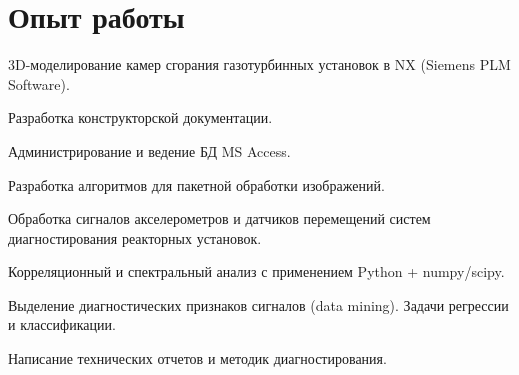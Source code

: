 \documentclass[a4paper]{resume}
\begin{document}
\begin{minipage}[t]{0.64\textwidth} %

\section{Опыт работы}


\vspace{\topsep} %
\begin{tightitemize}
\item 3D-моделирование камер сгорания газотурбинных установок в NX (Siemens PLM Software).
\item Разработка конструкторской документации.
\end{tightitemize}

\sectionspace 


\begin{tightitemize}
\item Администрирование и ведение БД MS Access.
\item Разработка алгоритмов для пакетной обработки изображений. 
\end{tightitemize}

\sectionspace 


\begin{tightitemize}
\item Обработка сигналов акселерометров и датчиков перемещений систем диагностирования реакторных установок. \item Корреляционный и спектральный анализ с применением Python + numpy/scipy.
\item Выделение диагностических признаков сигналов (data mining). Задачи регрессии и классификации.
\item Написание технических отчетов и методик диагностирования.
\end{tightitemize}


\end{minipage}
\end{document}
